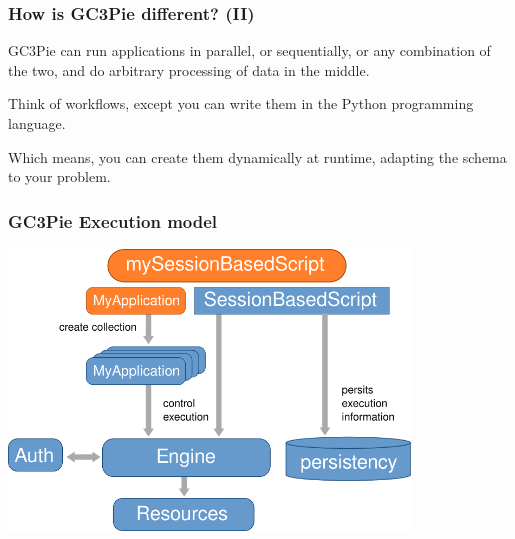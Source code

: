 \documentclass[english,serif,mathserif,xcolor=pdftex,dvipsnames,table]{beamer}
\begin{document}
\begin{frame}
  \frametitle{How is GC3Pie different? (II)}
  
  \begin{block}{}
    GC3Pie can run applications in parallel, or sequentially, or any
    combination of the two, and do arbitrary processing of data in the
    middle.
  \end{block}
  
  \begin{block}{}
    Think of {\color{Blue}workflows}, except you can write them in the Python
    programming language.
  \end{block}
  
  \begin{block}{}
    Which means, you can create them dynamically at runtime, adapting
    the schema to your problem.
  \end{block}
\end{frame}

\begin{frame}
  \frametitle{GC3Pie Execution model}
  \includegraphics[width=0.8\textwidth]{fig/GC3Pie_execution_model}
\end{frame}
\end{document}
